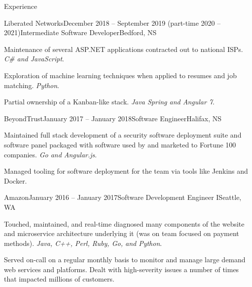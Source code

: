 \documentclass{resume} %
\begin{document}
\begin{rSection}{Experience}

\begin{rSubsection}{Liberated Networks}{December 2018 -- September 2019 (part-time 2020 -- 2021)}{Intermediate Software Developer}{Bedford, NS}
\item Maintenance of several ASP.NET applications contracted out to national ISPs. \textit{C\# and JavaScript}.
\item Exploration of machine learning techniques when applied to resumes and job matching. \textit{Python}.
\item Partial ownership of a Kanban-like stack. \textit{Java Spring and Angular 7}.
\end{rSubsection}

\begin{rSubsection}{BeyondTrust}{January 2017 -- January 2018}{Software Engineer}{Halifax, NS}
\item Maintained full stack development of a security software deployment suite and software panel packaged with software used by and marketed to Fortune 100 companies. \textit{Go and Angular.js}.
\item Managed tooling for software deployment for the team via tools like Jenkins and Docker.  
\end{rSubsection}


\begin{rSubsection}{Amazon}{January 2016 -- January 2017}{Software Development Engineer I}{Seattle, WA}
\item Touched, maintained, and real-time diagnosed many components of the website and microservice architecture underlying it (was on team focused on payment methods). \textit{Java, C++, Perl, Ruby, Go, and Python}.
\item Served on-call on a regular monthly basis to monitor and manage large demand web services and platforms. Dealt with high-severity issues a number of times that impacted millions of customers.
\end{rSubsection}

\end{rSection}

\end{document}
